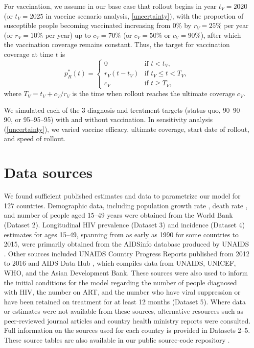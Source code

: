 \documentclass{article}
\begin{document}
For vaccination, we assume in our base case that rollout begins in
year $t_V = 2020$ (or $t_V = 2025$ in vaccine scenario analysis,
\autoref{uncertainty}), with the proportion of susceptible people
becoming vaccinated increasing from 0\% by $r_V = 25\%$ per year (or
$r_V = 10\%$ per year) up to $c_V = 70\%$ (or $c_V = 50\%$ or
$c_V = 90\%$), after which the vaccination coverage remains constant.
Thus, the target for vaccination coverage at time $t$ is
\begin{equation}
  \label{vaccination_target}
  p_R^*(t) =
  \begin{cases}
    0 & \text{if $t < t_V$},
    \\
    r_V (t - t_V) & \text{if $t_V \leq t < T_V$},
    \\
    c_V & \text{if $t \geq T_V$},
  \end{cases}
\end{equation}
where $T_V = t_V + c_V / r_V$ is the time when rollout reaches
the ultimate coverage $c_V$.

We simulated each of the 3 diagnosis and treatment targets (status
quo, 90--90--90, or 95--95--95) with and without vaccination.  In
sensitivity analysis (\autoref{uncertainty}), we varied vaccine
efficacy, ultimate coverage, start date of rollout, and speed of
rollout.


\section{Data sources}
\label{data_sources}

We found sufficient published estimates and data to parametrize our
model for 127 countries.  Demographic data, including population
growth rate \cite{WorldBankpg}, death
rate \cite{World_Development_Indicators2013-ee}, and number of people
aged 15--49 years \cite{The_World_Bank2016-fd} were obtained from the
World Bank (Dataset 2). Longitudinal HIV prevalence
(Dataset 3) and incidence (Dataset 4)
estimates for ages 15--49, spanning from as early as 1990 for some
countries to 2015, were primarily obtained from the AIDSinfo database
produced by UNAIDS \cite{Unaids2016-an}. Other sources included UNAIDS
Country Progress Reports \cite{Unaids2016-am} published from 2012 to
2016 and AIDS Data Hub \cite{AIDSdatahub-fg}, which compiles data from
UNAIDS, UNICEF, WHO, and the Asian Development Bank.  These sources
were also used to inform the initial conditions for the model
regarding the number of people diagnosed with HIV, the number on ART,
and the number who have viral suppression or have been retained on
treatment for at least 12 months (Dataset 5).  Where data
or estimates were not available from these sources, alternative
resources such as peer-reviewed journal articles and country health
ministry reports were consulted.  Full information on the sources used
for each country is provided in Datasets 2--5.  These
source tables are also available in our public source-code
repository \cite{medlock2016-git}.
\end{document}
